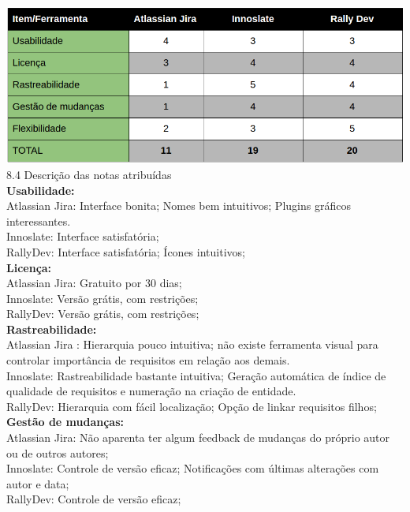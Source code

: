 \includegraphics[width=1\textwidth]{conteudo/resultados}\\

{\large{8.4 Descrição das notas atribuídas}}\\

\textbf{Usabilidade:}\\
	\tab Atlassian Jira: Interface bonita; Nomes bem intuitivos; Plugins gráficos interessantes.\\
	\tab Innoslate: Interface satisfatória; \\
	\tab RallyDev: Interface satisfatória; Ícones intuitivos;\\

\textbf{Licença:}\\
	\tab Atlassian Jira: Gratuito por 30 dias;\\
	\tab Innoslate: Versão grátis, com restrições;\\
	\tab RallyDev: Versão grátis, com restrições;\\

\textbf{Rastreabilidade:}\\
	\tab Atlassian Jira : Hierarquia pouco intuitiva; não existe ferramenta visual para controlar importância de requisitos em relação aos demais.\\
	\tab Innoslate: Rastreabilidade bastante intuitiva; Geração automática de índice de qualidade de requisitos e numeração na criação de entidade.\\
	\tab RallyDev: Hierarquia com fácil localização; Opção de linkar requisitos filhos;\\

\textbf{Gestão de mudanças:}\\
	\tab Atlassian Jira: Não aparenta ter algum feedback de mudanças do próprio autor ou de outros autores;\\
	\tab Innoslate: Controle de versão eficaz; Notificações com últimas alterações com autor e data;\\
	\tab RallyDev: Controle de versão eficaz;\\

